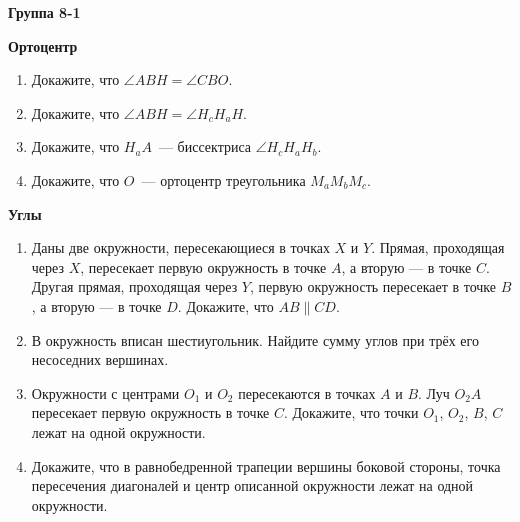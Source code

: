 \documentclass{article}
\begin{document}
\large


\begin{center}
\textbf{Группа 8-1}
\end{center}

\begin{center}
	\textbf{Ортоцентр}
\end{center}

\begin{enumerate}[label*=\protect\fbox{\arabic{enumi}}]

\item Докажите, что $\angle ABH = \angle CBO$.

\item Докажите, что $\angle ABH = \angle H_cH_aH$.

\item Докажите, что $H_aA$~--- биссектриса $ \angle H_cH_aH_b$.

\item Докажите, что $O$~--- ортоцентр треугольника $M_aM_bM_c$.

\end{enumerate}


\begin{center}
	\textbf{Углы}
\end{center}

\begin{enumerate}[label*=\protect\fbox{\arabic{enumi}}]
	
	\item Даны две окружности, пересекающиеся в точках $X$ и $Y$. Прямая, проходящая через $X$, пересекает первую окружность в точке $A$, а вторую — в точке $C$. Другая прямая, проходящая через $Y$, первую окружность пересекает в точке $B$, а вторую — в точке $D$. Докажите, что $AB \parallel CD$.
	
	\item В окружность вписан шестиугольник. Найдите сумму углов при трёх его несоседних вершинах.
	
	\item Окружности с центрами $O_1$ и $O_2$ пересекаются в точках $A$ и $B$. Луч $O_2A$ пересекает первую окружность в точке $C$. Докажите, что точки $O_1$, $O_2$, $B$, $C$ лежат на одной окружности.
	
	\item Докажите, что в равнобедренной трапеции вершины боковой стороны, точка пересечения диагоналей и центр описанной окружности лежат на одной окружности.
	
\end{enumerate}
\end{document}

